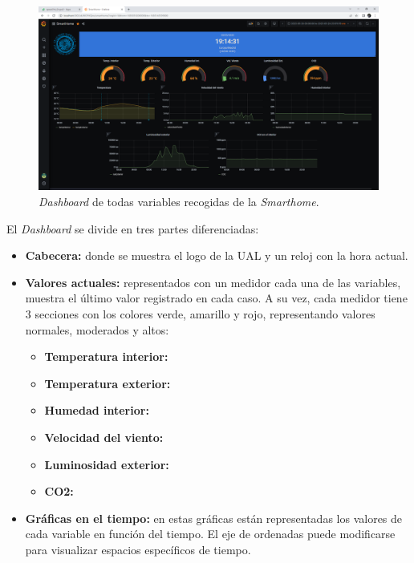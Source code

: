 \begin{figure}[h]
    \centering
    \includegraphics[width=1\linewidth]{imagenes//capitulo4/dashboard.png}
    \caption{\textit{Dashboard} de todas variables recogidas de la \textit{Smarthome}.}
    \label{fig:dashboard}
\end{figure}

El \textit{Dashboard} se divide en tres partes diferenciadas:

\begin{itemize}
    \item \textbf{Cabecera:} donde se muestra el logo de la UAL y un reloj con la hora actual.
    \item \textbf{Valores actuales:} representados con un medidor cada una de las variables, muestra el último valor registrado en cada caso. A su vez, cada medidor tiene 3 secciones con los colores verde, amarillo y rojo, representando valores normales, moderados y altos:
    \begin{itemize}
        \item \textbf{Temperatura interior:}
        \item \textbf{Temperatura exterior:}
        \item \textbf{Humedad interior:}
        \item \textbf{Velocidad del viento:}
        \item \textbf{Luminosidad exterior:}
        \item \textbf{CO2:}
    \end{itemize}
    \item \textbf{Gráficas en el tiempo:} en estas gráficas están representadas los valores de cada variable en función del tiempo. El eje de ordenadas puede modificarse para visualizar espacios específicos de tiempo.
\end{itemize}
